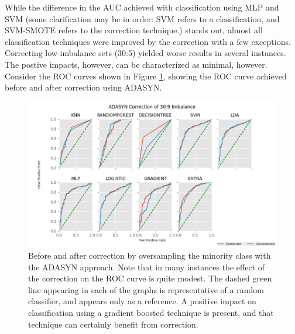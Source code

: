 \documentclass[letterpaper]{article}
\begin{document}
{While the difference in the AUC achieved with classification using MLP and SVM (some clarification may be in order: SVM refers to a classification, and SVM-SMOTE refers to the correction technique.) stands out, almost all classification techniques were improved by the correction with a few exceptions. Correcting low-imbalance sets (30:5) yielded worse results in several instances. The postive impacts, however, can be characterized as minimal, however. Consider the ROC curves shown in Figure \ref{fig:auc}, showing the ROC curve achieved before and after correction using ADASYN.

\begin{figure}[h]
	\centering
	\includegraphics[height=0.25\textheight]{figures/roc-corrected.png}
	\caption[Before and after correction]{Before and after correction by oversampling the minority class with the ADASYN approach. Note that in many instances the effect of the correction on the ROC curve is quite modest. The dashed green line appearing in each of the graphs is representative of a random classifier, and appears only as a reference. A positive impact on classification using a gradient boosted technique is present, and that technique can certainly benefit from correction. }
	\label{fig:auc}
\end{figure}

}
\end{document}
